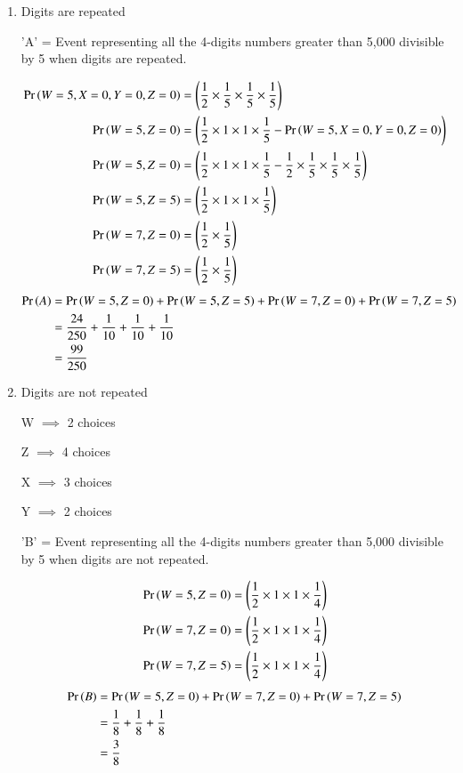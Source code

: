 \documentclass[journal,12pt,onecolumn]{IEEEtran}
\begin{document}
\begin{enumerate}
\item Digits are repeated

 \begin{table}[h]
\begin{center}
		
		\caption{}
		\label{tab:xxx}
\end{center}	
	\end{table}

'A' = Event representing all the 4-digits numbers greater than 5,000 divisible by 5 when digits are repeated.

\begin{align}
\Pr\left(W=5,X=0,Y=0,Z=0\right) &= \left(\frac{1}{2}\times\frac{1}{5}\times\frac{1}{5}\times\frac{1}{5} \right) \\
\Pr\left(W=5,Z=0\right) &= \left(\frac{1}{2}\times1\times1\times\frac{1}{5} - \Pr\left(W=5,X=0,Y=0,Z=0\right) \right) \\
\Pr\left(W=5,Z=0\right) &= \left(\frac{1}{2}\times1\times1\times\frac{1}{5} - \frac{1}{2}\times\frac{1}{5}\times\frac{1}{5}\times\frac{1}{5} \right) \\
\Pr\left(W=5,Z=5\right) &= \left(\frac{1}{2}\times1\times1\times\frac{1}{5}\right) \\
\Pr\left(W=7,Z=0\right) &= \left(\frac{1}{2}\times\frac{1}{5} \right) \\
\Pr\left(W=7,Z=5\right) &= \left(\frac{1}{2}\times\frac{1}{5} \right) \\
\end{align}
\begin{align}
\Pr\left(A\right) &= \Pr\left(W=5,Z=0\right) + \Pr\left(W=5,Z=5\right) + \Pr\left(W=7,Z=0\right) + \Pr\left(W=7,Z=5\right) \\
 &=\frac{24}{250} + \frac{1}{10} + \frac{1}{10} + \frac{1}{10}\\
&= \frac{99}{250}
 \end{align}

\item Digits are not repeated 
    \begin{center}
    W $\implies$ 2 choices

    Z $\implies$ 4 choices

    X $\implies$ 3 choices

    Y $\implies$ 2 choices
    \end{center}

'B' = Event representing all the 4-digits numbers greater than 5,000 divisible by 5 when digits are not repeated.

\begin{align}
\Pr\left(W=5,Z=0\right) &= \left(\frac{1}{2}\times1\times1\times\frac{1}{4} \right) \\
\Pr\left(W=7,Z=0\right) &= \left(\frac{1}{2}\times1\times1\times\frac{1}{4}\right) \\
\Pr\left(W=7,Z=5\right) &= \left(\frac{1}{2}\times1\times1\times\frac{1}{4}\right) 
\end{align}
\begin{align}
\Pr\left(B\right) &= \Pr\left(W=5,Z=0\right) + \Pr\left(W=7,Z=0\right) + \Pr\left(W=7,Z=5\right) \\
&= \frac{1}{8} + \frac{1}{8} + \frac{1}{8} \\
&= \frac{3}{8}
\end{align}
\end{enumerate}
\end{document}
